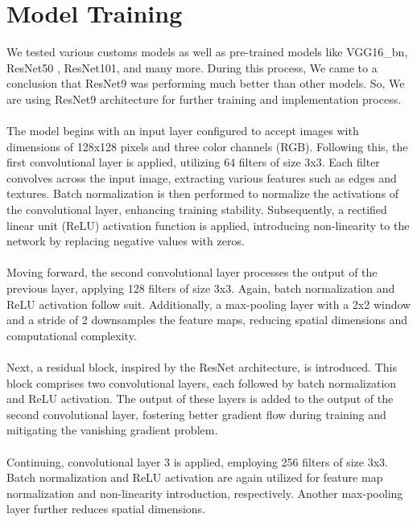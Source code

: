 	\section{Model Training}
		We tested various customs models as well as pre-trained models like VGG16\_bn\cite{simonyan2015deep}, ResNet50 \cite{DBLP:journals/corr/HeZRS15}, ResNet101\cite{DBLP:journals/corr/HeZRS15}, and many more. During this process, We came to a conclusion that ResNet9 was performing much better than other models. So, We are using ResNet9 architecture for further training and implementation process.\\\\
		The model begins with an input layer configured to accept images with dimensions of 128x128 pixels and three color channels (RGB). Following this, the first convolutional layer is applied, utilizing 64 filters of size 3x3. Each filter convolves across the input image, extracting various features such as edges and textures. Batch normalization is then performed to normalize the activations of the convolutional layer, enhancing training stability. Subsequently, a rectified linear unit (ReLU) activation function is applied, introducing non-linearity to the network by replacing negative values with zeros.\\\\
		Moving forward, the second convolutional layer processes the output of the previous layer, applying 128 filters of size 3x3. Again, batch normalization and ReLU activation follow suit. Additionally, a max-pooling layer with a 2x2 window and a stride of 2 downsamples the feature maps, reducing spatial dimensions and computational complexity.\\\\
		Next, a residual block, inspired by the ResNet architecture, is introduced. This block comprises two convolutional layers, each followed by batch normalization and ReLU activation. The output of these layers is added to the output of the second convolutional layer, fostering better gradient flow during training and mitigating the vanishing gradient problem.\\\\
		Continuing, convolutional layer 3 is applied, employing 256 filters of size 3x3. Batch normalization and ReLU activation are again utilized for feature map normalization and non-linearity introduction, respectively. Another max-pooling layer further reduces spatial dimensions.\\\\
